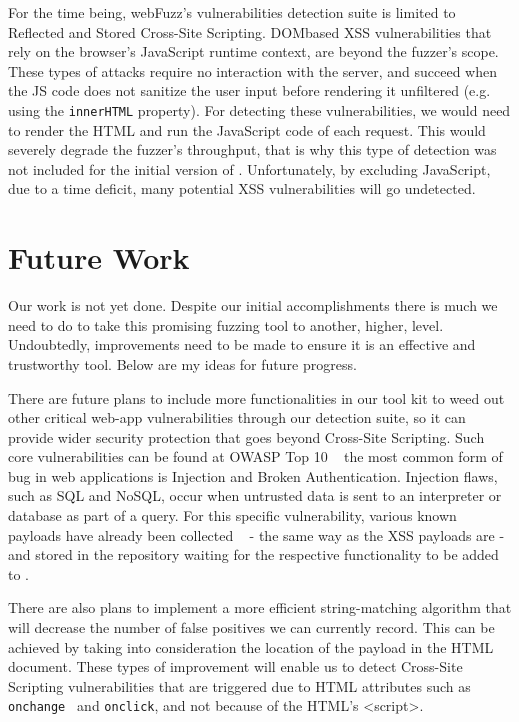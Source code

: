 For the time being, webFuzz's vulnerabilities detection suite is limited to Reflected and Stored Cross-Site Scripting. DOMbased XSS vulnerabilities that rely on the browser's JavaScript runtime context, are beyond the fuzzer's scope. These types of attacks require no interaction with
the server, and succeed when the JS code does not sanitize the user input before rendering it unfiltered (e.g. using the {\tt innerHTML} property). For detecting these vulnerabilities, we would need to render the HTML and run the JavaScript code of each request. This would severely degrade the fuzzer's throughput, that is why this type of detection was not included for the initial version of \pname{}.  Unfortunately, by excluding JavaScript, due to a time deficit, many potential XSS vulnerabilities will go undetected.

\section{Future Work}
Our work is not yet done. Despite our initial accomplishments there is much we need to do to take this promising fuzzing tool to another, higher, level. Undoubtedly, improvements need to be made to ensure it is an effective and trustworthy tool. Below are my ideas for future progress.

There are future plans to include more functionalities in our tool kit to weed out other critical web-app vulnerabilities through our detection suite, so it can provide wider security protection that goes beyond Cross-Site Scripting. Such core vulnerabilities can be found at OWASP Top 10 ~\cite{owasp2017} the most common form of bug in web applications is Injection and Broken Authentication. Injection flaws, such as SQL and NoSQL, occur when untrusted data is sent to an interpreter or database as part of a query. For this specific vulnerability, various known payloads have already been collected ~\cite{seclist} - the same way as the XSS payloads are - and stored in the repository waiting for the respective functionality to be added to \pname{}.

There are also plans to implement a more efficient string-matching algorithm that will decrease the number of false positives we can currently record. This can be achieved by taking into consideration the location of the payload in the HTML document. These types of improvement will enable us to detect Cross-Site Scripting vulnerabilities that are triggered due to HTML attributes such as {\tt onchange } and {\tt onclick}, and not because of the HTML's <script>.

